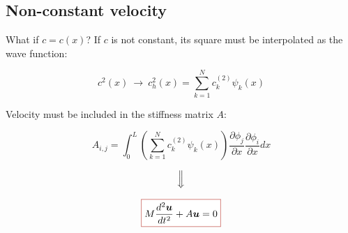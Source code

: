 \subsection{Non-constant velocity}

\begin{frame}{What if $c=c(x)$?}
    If $c$ is not constant, its square must be interpolated as the wave function:

    \begin{equation*}
        c^2(x) \ \longrightarrow \ c_h^2(x)=\sum_{k=1}^Nc_k^{(2)}\psi_k(x)
    \end{equation*}

    \pause

    Velocity must be included in the stiffness matrix $A$:

    \begin{equation*}
        A_{i,j}=\int_0^L\left(\sum_{k=1}^Nc_k^{(2)}\psi_k(x)\right)\frac{\partial\phi_j}{\partial x}\frac{\partial\phi_i}{\partial x}dx
    \end{equation*}

    \pause

    \begin{equation*}
        \Big\Downarrow
    \end{equation*}

    \begin{equation*}
        \fcolorbox{BrickRed}{white}{\text{$\displaystyle M\frac{d^2\boldsymbol{u}}{dt^2}+A\boldsymbol{u}=0$}}
    \end{equation*}
\end{frame}

